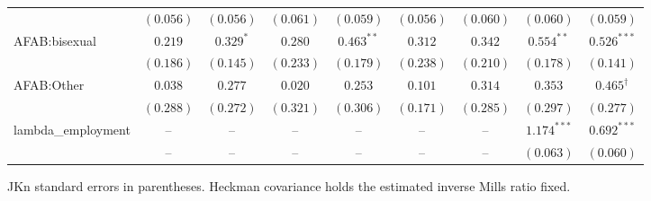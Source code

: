\begin{landscape}
\begin{longtable}{lcccccccc}
 & $(0.056)$ & $(0.056)$ & $(0.061)$ & $(0.059)$ & $(0.056)$ & $(0.060)$ & $(0.060)$ & $(0.059)$ \\
AFAB:bisexual & $0.219$ & $0.329^{*}$ & $0.280$ & $0.463^{**}$ & $0.312$ & $0.342$ & $0.554^{**}$ & $0.526^{***}$ \\
 & $(0.186)$ & $(0.145)$ & $(0.233)$ & $(0.179)$ & $(0.238)$ & $(0.210)$ & $(0.178)$ & $(0.141)$ \\
AFAB:Other & $0.038$ & $0.277$ & $0.020$ & $0.253$ & $0.101$ & $0.314$ & $0.353$ & $0.465^{\dagger}$ \\
 & $(0.288)$ & $(0.272)$ & $(0.321)$ & $(0.306)$ & $(0.171)$ & $(0.285)$ & $(0.297)$ & $(0.277)$ \\
lambda\_employment & -- & -- & -- & -- & -- & -- & $1.174^{***}$ & $0.692^{***}$ \\
 & -- & -- & -- & -- & -- & -- & $(0.063)$ & $(0.060)$ \\
\end{longtable}
JKn standard errors in parentheses. Heckman covariance holds the estimated inverse Mills ratio fixed.
\endgroup
\end{landscape}
